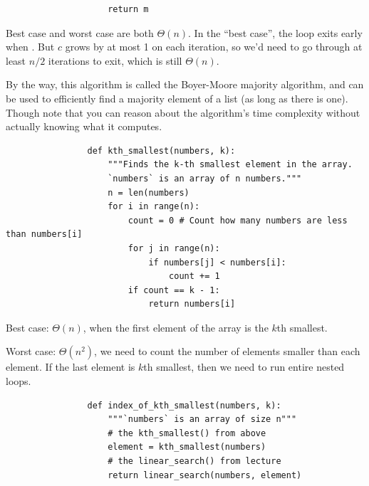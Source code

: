 \begin{prob}
\begin{subprobset}
\begin{subprob}
\begin{verbatim}
                    return m
            \end{verbatim}
            

            \begin{soln}
                Best case and worst case are both $\Theta(n)$. In the ``best case'',
                the loop exits early when . But $c$ grows by
                at most 1 on each iteration, so we'd need to go through at least
                $n / 2$ iterations to exit, which is still $\Theta(n)$.

                By the way, this algorithm is called the Boyer-Moore majority algorithm,
                and can be used to efficiently find a majority element of a list (as long
                as there is one). Though note that you can reason about the
                algorithm's time complexity without actually knowing what it
                computes.
            \end{soln}
        \end{subprob}

        \begin{subprob}
            \begin{verbatim}
                def kth_smallest(numbers, k):
                    """Finds the k-th smallest element in the array.
                    `numbers` is an array of n numbers."""
                    n = len(numbers)
                    for i in range(n):
                        count = 0 # Count how many numbers are less than numbers[i]
                        for j in range(n):
                            if numbers[j] < numbers[i]:
                                count += 1
                        if count == k - 1:
                            return numbers[i]
            \end{verbatim}
            
            \begin{soln}
                Best case: $\Theta(n)$, when the first element of the array is the $k$th smallest.

                Worst case: $\Theta(n^2)$, we need to count the number of elements smaller than each element. If the last element is $k$th smallest, then we need to run entire nested loops.
            \end{soln}
        \end{subprob}

        \begin{subprob}
            \begin{verbatim}
                def index_of_kth_smallest(numbers, k):
                    """`numbers` is an array of size n"""
                    # the kth_smallest() from above
                    element = kth_smallest(numbers)
                    # the linear_search() from lecture
                    return linear_search(numbers, element)
            \end{verbatim}
            


\end{subprob}
\end{subprobset}
\end{prob}
